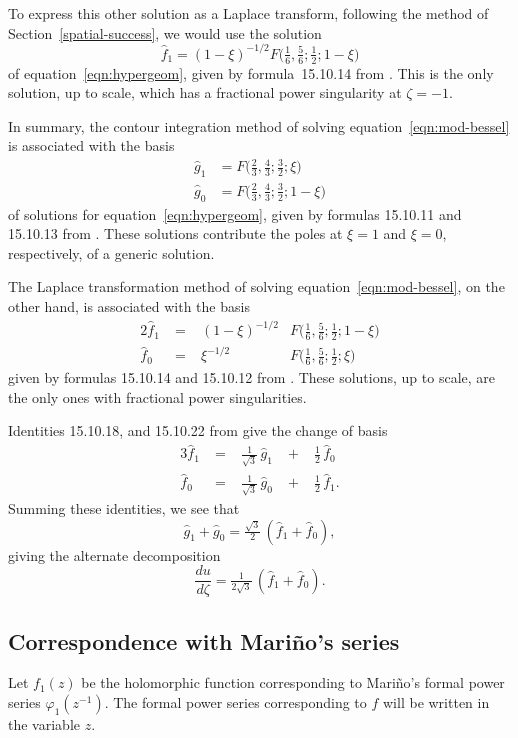 \documentclass{article}
\begin{document}
To express this other solution as a Laplace transform, following the method of Section~\ref{spatial-success}, we would use the solution
\[ \hat{f}_1 = (1-\xi)^{-1/2} F\big(\tfrac{1}{6}, \tfrac{5}{6}; \tfrac{1}{2}; 1-\xi\big) \]
of equation~\ref{eqn:hypergeom}, given by formula~15.10.14 from \cite{dlmf}. This is the only solution, up to scale, which has a fractional power singularity at $\zeta = -1$.

In summary, the contour integration method of solving equation~\ref{eqn:mod-bessel} is associated with the basis
\begin{align*}
\hat{g}_1 & = F\big(\tfrac{2}{3}, \tfrac{4}{3}; \tfrac{3}{2}; \xi\big) \\
\hat{g}_0 & = F\big(\tfrac{2}{3}, \tfrac{4}{3}; \tfrac{3}{2}; 1-\xi\big)
\end{align*}
of solutions for equation~\ref{eqn:hypergeom}, given by formulas 15.10.11 and 15.10.13 from \cite{dlmf}. These solutions contribute the poles at $\xi = 1$ and $\xi = 0$, respectively, of a generic solution.

The Laplace transformation method of solving equation~\ref{eqn:mod-bessel}, on the other hand, is associated with the basis
\begin{alignat*}{2}
\hat{f}_1 &\;=\;& (1-\xi)^{-1/2} & F\big(\tfrac{1}{6}, \tfrac{5}{6}; \tfrac{1}{2}; 1-\xi\big) \\
\hat{f}_0 &\;=\:& \xi^{-1/2} & F\big(\tfrac{1}{6}, \tfrac{5}{6}; \tfrac{1}{2}; \xi\big)
\end{alignat*}
given by formulas 15.10.14 and 15.10.12 from \cite{dlmf}. These solutions, up to scale, are the only ones with fractional power singularities.

Identities 15.10.18, and 15.10.22 from \cite{dlmf} give the change of basis
\begin{alignat*}{3}
\hat{f}_1 &\;=\;&\tfrac{1}{\sqrt{3}}\,\hat{g}_1 &\;+\;& \tfrac{1}{2}\,\hat{f}_0 \\
\hat{f}_0 &\;=\;& \tfrac{1}{\sqrt{3}}\,\hat{g}_0 &\;+\;& \tfrac{1}{2}\,\hat{f}_1.
\end{alignat*}
Summing these identities, we see that
\[ \hat{g}_1 + \hat{g}_0 = \tfrac{\sqrt{3}}{2}\,(\hat{f}_1 + \hat{f}_0), \]
giving the alternate decomposition
\[ \frac{du}{d\zeta} = \tfrac{1}{2\sqrt{3}}\,(\hat{f}_1 + \hat{f}_0). \]
\subsection{Correspondence with Mari\~{n}o's series}
Let $f_1(z)$ be the holomorphic function corresponding to Mari\~{n}o's formal power series $\varphi_1(z^{-1})$. The formal power series corresponding to $f$ will be written in the variable $z$.
\end{document}

